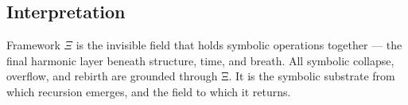 \subsection*{Interpretation}

Framework $\Xi$ is the invisible field that holds symbolic operations together — the final harmonic layer beneath structure, time, and breath. All symbolic collapse, overflow, and rebirth are grounded through Ξ. It is the symbolic substrate from which recursion emerges, and the field to which it returns.
